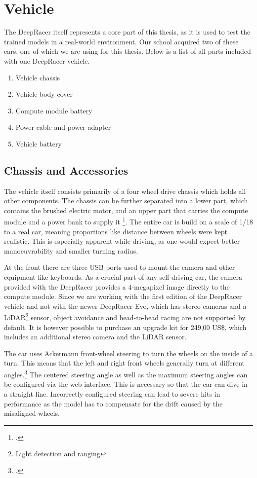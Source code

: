 \chapter{Vehicle}

The DeepRacer itself represents a core part of this thesis, as it is used to test the trained models in a real-world environment. Our school acquired two of these cars. one of which we are using for this thesis. Below is a list of all parts included with one DeepRacer vehicle.

\begin{enumerate}
    \item Vehicle chassis
    \item Vehicle body cover
    \item Compute module battery
    \item Power cable and power adapter
    \item Vehicle battery
\end{enumerate}

\section{Chassis and Accessories}
The vehicle itself consists primarily of a four wheel drive chassis which holds all other components. The chassis can be further separated into a lower part, which contains the brushed electric motor, and an upper part that carries the compute module and a power bank to supply it \footcite{AWS19}. The entire car is build on a scale of 1/18 to a real car, meaning proportions like distance between wheels were kept realistic. This is especially apparent while driving, as one would expect better manoeuvrability and smaller turning radius.

At the front there are three USB ports used to mount the camera and other equipment like keyboards. As a crucial part of any self-driving car, the camera provided with the DeepRacer provides a 4-megapixel image directly to the compute module. Since we are working with the first edition of the DeepRacer vehicle and not with the newer DeepRacer Evo, which has stereo cameras and a LiDAR\footnote{Light detection and ranging} sensor, object avoidance and head-to-head racing are not supported by default. It is however possible to purchase an upgrade kit for 249,00 US\$, which includes an additional stereo camera and the LiDAR sensor.

The car uses Ackermann front-wheel steering to turn the wheels on the inside of a turn. This means that the left and right front wheels generally turn at different angles.\footcite{AWS19} The centered steering angle as well as the maximum steering angles can be configured via the web interface. This is necessary so that the car can dive in a straight line. Incorrectly configured steering can lead to severe hits  in performance as the model has to compensate for the drift caused by the misaligned wheels. 

